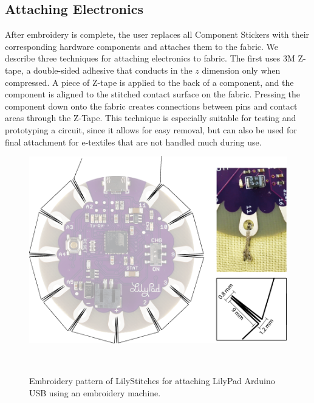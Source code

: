 \documentclass[header.tex]{subfiles}
\begin{document}
\subsection{Attaching Electronics}




After embroidery is complete, the user replaces all Component Stickers with their corresponding hardware components and attaches them to the fabric.
We describe three techniques for attaching electronics to fabric. The first uses 3M Z-tape, a double-sided adhesive that conducts in the $z$ dimension only when compressed. A piece of Z-tape is applied to the back of a component, and the component is aligned to the stitched contact surface on the fabric. Pressing the component down onto the fabric creates connections between pins and contact areas through the Z-Tape. This technique is especially suitable for testing and prototyping a circuit, since it allows for easy removal, but can also be used for final attachment for e-textiles that are not handled much during use.


\begin{figure}
\centering
  \includegraphics[width=0.8\columnwidth]{figures/LilyStitch}
  \caption{Embroidery pattern of LilyStitches for attaching LilyPad Arduino USB using an embroidery machine.}~\label{fig:LilyStitch}
  \vspace{-2.5em}
\end{figure}
\end{document}

